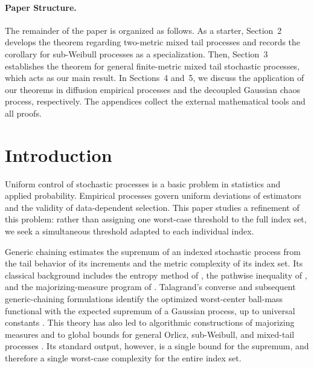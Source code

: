 \documentclass[11pt]{article}
\begin{document}
\paragraph{Paper Structure.} The remainder of the paper is organized as follows. As a starter, Section~2 develops
the theorem regarding two-metric mixed tail processes and records the corollary for sub-Weibull processes as a
specialization. Then, Section~3 establishes the theorem for general finite-metric mixed tail stochastic processes, which acts as our main result.
In Sections~4 and~5, we discuss the application of our theorems in diffusion empirical processes and the decoupled
Gaussian chaos process, respectively. The appendices collect the external mathematical tools and all
proofs.


\iffalse
\section{Introduction}
\label{sec:introduction}

Uniform control of stochastic processes is a basic problem in statistics and
applied probability.  Empirical processes govern uniform deviations of
estimators and the validity of data-dependent selection.  This paper studies a refinement of this problem: rather than assigning one worst-case threshold to the full
index set, we seek a simultaneous threshold adapted to each individual index.

Generic chaining estimates the supremum of an indexed stochastic process from the tail
behavior of its increments and the metric complexity of its index set.  Its
classical background includes the entropy method of
\citet{dudley1967sizes}, the pathwise inequality of
\citet{garsia1971real}, and the majorizing-measure program of
\citet{fernique1971regularite,preston1972continuity,
fernique1975regularite}.  Talagrand's converse and subsequent generic-chaining
formulations identify the optimized worst-center ball-mass functional with the
expected supremum of a Gaussian process, up to universal constants
\citep{talagrand1987regularity,talagrand1992simple,
talagrand1994constructions,talagrand1996majorizing,
talagrand2001without,talagrand2005generic}.  This theory has also led to
algorithmic constructions of majorizing measures \citep{borst2021optimizer}
and to global bounds for general Orlicz, sub-Weibull, and mixed-tail processes
\citep{talagrand1990sample,dirksen2015tail}.  Its standard output, however, is
a single bound for the supremum, and therefore a single worst-case complexity
for the entire index set.
\end{document}
